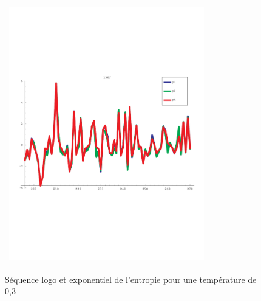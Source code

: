 \documentclass[a4paper,12pt]{article}
\begin{document}
\begin{figure}[t]
\begin{tabular}{cc}
       \includegraphics[trim=0cm 8cm 0cm 6cm,clip,width=8.5cm]{images/1R6J_simil_bypos.pdf} \\
     \end{tabular}
     
     \caption{Séquence logo et exponentiel de l'entropie pour une température de 0,3}
     \label{fig-seqlogo-T=03}
   \end{figure}
\end{document}
